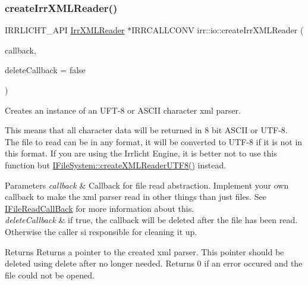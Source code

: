 \subsubsection{\texorpdfstring{create\+Irr\+X\+M\+L\+Reader()}{createIrrXMLReader()}\hspace{0.1cm}{\footnotesize\ttfamily [3/3]}}
{\footnotesize\ttfamily I\+R\+R\+L\+I\+C\+H\+T\+\_\+\+A\+PI \hyperlink{namespaceirr_1_1io_a682f8a2c4c57259bfde1ec8fa27a565b}{Irr\+X\+M\+L\+Reader} $\ast$I\+R\+R\+C\+A\+L\+L\+C\+O\+NV irr\+::io\+::create\+Irr\+X\+M\+L\+Reader (\begin{DoxyParamCaption}\item[{\hyperlink{classirr_1_1io_1_1IFileReadCallBack}{I\+File\+Read\+Call\+Back} $\ast$}]{callback,  }\item[{bool}]{delete\+Callback = {\ttfamily false} }\end{DoxyParamCaption})}



Creates an instance of an U\+F\+T-\/8 or A\+S\+C\+II character xml parser. 

This means that all character data will be returned in 8 bit A\+S\+C\+II or U\+T\+F-\/8. The file to read can be in any format, it will be converted to U\+T\+F-\/8 if it is not in this format. If you are using the Irrlicht Engine, it is better not to use this function but \hyperlink{classirr_1_1io_1_1IFileSystem_affd8f622ac7c3dcd507f20f9cd23b21f}{I\+File\+System\+::create\+X\+M\+L\+Reader\+U\+T\+F8()} instead. 
\begin{DoxyParams}{Parameters}
{\em callback} & Callback for file read abstraction. Implement your own callback to make the xml parser read in other things than just files. See \hyperlink{classirr_1_1io_1_1IFileReadCallBack}{I\+File\+Read\+Call\+Back} for more information about this. \\
\hline
{\em delete\+Callback} & if true, the callback will be deleted after the file has been read. Otherwise the caller si responsible for cleaning it up. \\
\hline
\end{DoxyParams}
\begin{DoxyReturn}{Returns}
Returns a pointer to the created xml parser. This pointer should be deleted using \textquotesingle{}delete\textquotesingle{} after no longer needed. Returns 0 if an error occured and the file could not be opened. 
\end{DoxyReturn}
\mbox{\label{namespaceirr_1_1io_a2b7451dc3f1606c80bf46be9ccc955d9}} 
